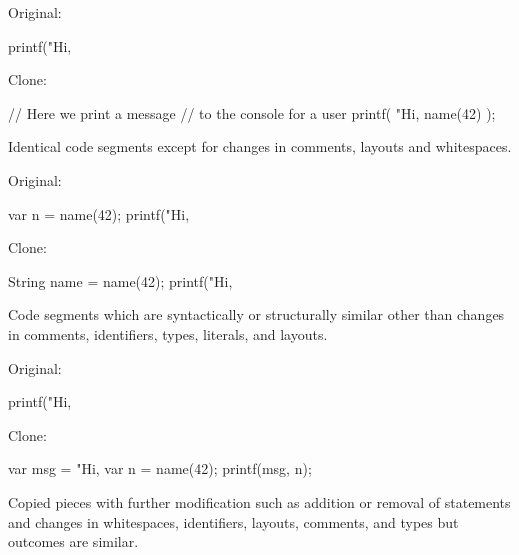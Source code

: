 \documentclass{article}
\begin{document}

\begin{multicols}{2}
Original:\par
{\small\begin{ffcode}
printf("Hi, %
\end{ffcode}
}
Clone:\par
{\small\begin{ffcode}
// Here we print a message
// to the console for a user
printf(
  "Hi, %
  name(42)
);
\end{ffcode}
}
\par\columnbreak\par
Identical code segments except for changes in comments, layouts and whitespaces.
\end{multicols}
\plush{}

\begin{multicols}{2}
Original:\par
{\small\begin{ffcode}
var n = name(42);
printf("Hi, %
\end{ffcode}
}
Clone:\par
{\small\begin{ffcode}
String name = name(42);
printf("Hi, %
\end{ffcode}
}
\par\columnbreak\par
Code segments which are syntactically or structurally similar other than changes in comments, identifiers, types, literals, and layouts.
\end{multicols}
\plush{}

\begin{multicols}{2}
Original:\par
{\small\begin{ffcode}
printf("Hi, %
\end{ffcode}
}
Clone:\par
{\small\begin{ffcode}
var msg = "Hi, %
var n = name(42);
printf(msg, n);
\end{ffcode}
}
\par\columnbreak\par
Copied pieces with further modification such as addition or removal of statements and changes in whitespaces, identifiers, layouts, comments, and types but outcomes are similar.
\end{multicols}
\plush{}
\end{document}
